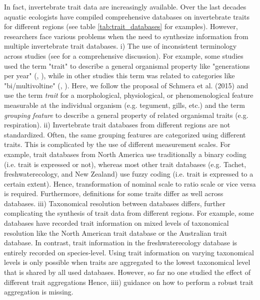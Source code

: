 \documentclass{article}
\begin{document}
In fact, invertebrate trait data are increasingly available. Over the last decades aquatic 
ecologists have compiled comprehensive databases on invertebrate traits for different regions 
(see table \ref{tab:trait_databases} for examples). 
However, researchers face various problems when the need to synthesize information from 
multiple invertebrate trait databases. 
i) The use of inconsistent terminology across studies (see \cite{schmera_proposed_2015}
for a comprehensive discussion). 
For example, some studies used the term "trait" to describe a general 
organismal property like "generations per year" (\cite{statzner_reproductive_1997}, 
\cite{ussegliopolatera_biological_2000}), while in other studies this 
term was related to categories like "bi/multivoltine" 
(\cite{haybach_use_2004}, \cite{vieira_database_nodate}). Here, we follow 
the proposal of Schmera et al. (2015) and use the term \textit{trait} for a morphological,
physiological, or phenomenological feature measurable at the individual
organism (e.g. tegument, gills, etc.) and the term \textit{grouping feature} to describe 
a general property of related organismal traits (e.g. respiration). 
ii) Invertebrate trait databases from different regions are not standardized. 
Often, the same grouping features are categorized using different traits. 
This is complicated by the use of different measurement scales. For example, trait databases 
from North America use traditionally a binary coding (i.e. trait is expressed or not), 
whereas most other trait databases (e.g. Tachet, freshwaterecology, and New Zealand) 
use fuzzy coding (i.e. trait is expressed to a certain extent). 
Hence, transformation of nominal scale to ratio scale or vice versa is required. %
Furthermore, definitions for some traits differ as well across databases. 
iii) Taxonomical resolution between databases differs, further complicating the
synthesis of trait data from different regions. For example, some databases have recorded
trait information on mixed levels of taxonomical resolution like the North American trait
database or the Australian trait database. In contrast, trait information in the 
freshwaterecology database is entirely recorded on species-level. %
Using trait information on varying taxonomical levels is only possible when 
traits are aggregated to the lowest taxonomical level that is shared by all used databases. 
However, so far no one studied the effect of different trait aggregations 
Hence, iiii) guidance on how to perform a robust trait aggregation is missing. 
\end{document}
